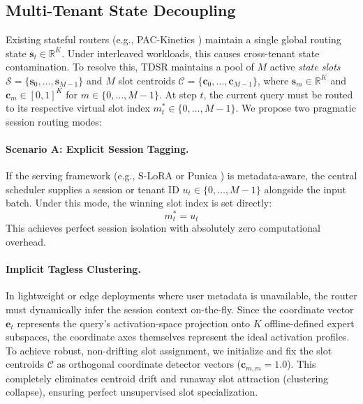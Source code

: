 \subsection{Multi-Tenant State Decoupling}
Existing stateful routers (e.g., PAC-Kinetics \cite{pac_zca_2026}) maintain a single global routing state $\mathbf{s}_t \in \mathbb{R}^K$. Under interleaved workloads, this causes cross-tenant state contamination. To resolve this, TDSR maintains a pool of $M$ active \emph{state slots} $\mathcal{S} = \{\mathbf{s}_0, \dots, \mathbf{s}_{M-1}\}$ and $M$ slot centroids $\mathcal{C} = \{\mathbf{c}_0, \dots, \mathbf{c}_{M-1}\}$, where $\mathbf{s}_m \in \mathbb{R}^K$ and $\mathbf{c}_m \in [0, 1]^K$ for $m \in \{0, \dots, M-1\}$. At step $t$, the current query must be routed to its respective virtual slot index $m^*_t \in \{0,\dots, M-1\}$. We propose two pragmatic session routing modes:

\paragraph{Scenario A: Explicit Session Tagging.}
If the serving framework (e.g., S-LoRA \cite{s-lora} or Punica \cite{chen2023punica}) is metadata-aware, the central scheduler supplies a session or tenant ID $u_t \in \{0, \dots, M-1\}$ alongside the input batch. Under this mode, the winning slot index is set directly:
\begin{equation}
m^*_t = u_t
\end{equation}
This achieves perfect session isolation with absolutely zero computational overhead.

\paragraph{Implicit Tagless Clustering.}
In lightweight or edge deployments where user metadata is unavailable, the router must dynamically infer the session context on-the-fly. Since the coordinate vector $\mathbf{e}_t$ represents the query's activation-space projection onto $K$ offline-defined expert subspaces, the coordinate axes themselves represent the ideal activation profiles. To achieve robust, non-drifting slot assignment, we initialize and fix the slot centroids $\mathcal{C}$ as orthogonal coordinate detector vectors ($\mathbf{c}_{m, m} = 1.0$). This completely eliminates centroid drift and runaway slot attraction (clustering collapse), ensuring perfect unsupervised slot specialization. 

